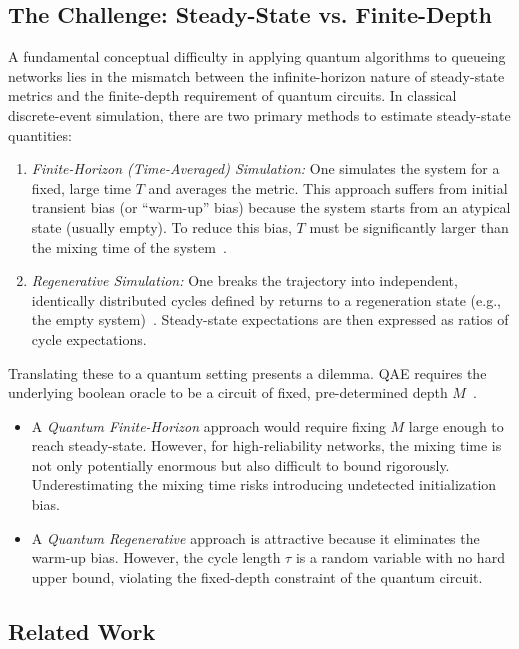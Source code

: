 \documentclass[11pt]{article}
\begin{document}
\subsection{The Challenge: Steady-State vs. Finite-Depth}
A fundamental conceptual difficulty in applying quantum algorithms to queueing networks lies in the mismatch between the infinite-horizon nature of steady-state metrics and the finite-depth requirement of quantum circuits. In classical discrete-event simulation, there are two primary methods to estimate steady-state quantities:
\begin{enumerate}
    \item \textit{Finite-Horizon (Time-Averaged) Simulation:} One simulates the system for a fixed, large time $T$ and averages the metric. This approach suffers from initial transient bias (or ``warm-up'' bias) because the system starts from an atypical state (usually empty). To reduce this bias, $T$ must be significantly larger than the mixing time of the system~\cite{asmussen2007applied}.
    \item \textit{Regenerative Simulation:} One breaks the trajectory into independent, identically distributed cycles defined by returns to a regeneration state (e.g., the empty system)~\cite{asmussen2007applied, AsmussenGlynn2007, glynn1994simulation, kang2007exploiting}. Steady-state expectations are then expressed as ratios of cycle expectations.
\end{enumerate}

Translating these to a quantum setting presents a dilemma. QAE requires the underlying boolean oracle to be a circuit of fixed, pre-determined depth $M$~\cite{brassard2002quantum}.
\begin{itemize}
    \item A \textit{Quantum Finite-Horizon} approach would require fixing $M$ large enough to reach steady-state. However, for high-reliability networks, the mixing time is not only potentially enormous but also difficult to bound rigorously. Underestimating the mixing time risks introducing undetected initialization bias.
    \item A \textit{Quantum Regenerative} approach is attractive because it eliminates the warm-up bias. However, the cycle length $\tau$ is a random variable with no hard upper bound, violating the fixed-depth constraint of the quantum circuit.
\end{itemize}

\subsection{Related Work}
\end{document}
